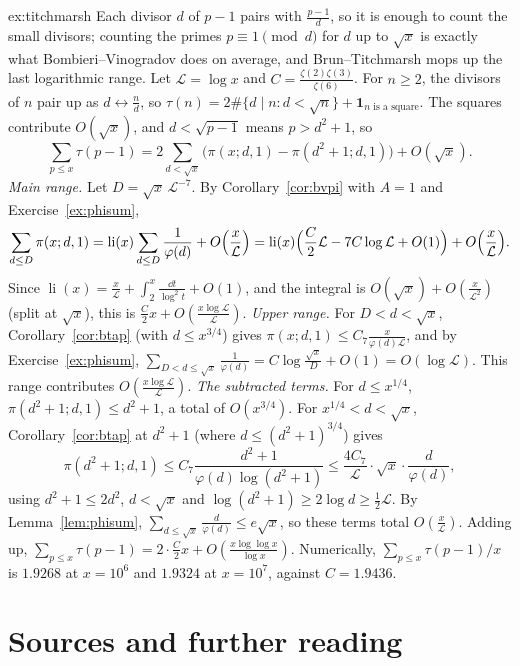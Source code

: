 \begin{solution}{ex:titchmarsh}
\idea Each divisor $d$ of $p-1$ pairs with $\frac{p-1}d$, so it is enough to count the small divisors; counting the primes $p\equiv1\pmod d$ for $d$ up to $\sqrt x$ is exactly what Bombieri--Vinogradov does on average, and Brun--Titchmarsh mops up the last logarithmic range.
\writeup Let $\mathcal L=\log x$ and $C=\frac{\zeta(2)\zeta(3)}{\zeta(6)}$. For $n\ge2$, the divisors of $n$ pair up as $d\leftrightarrow\frac nd$, so $\tau(n)=2\#\{d\mid n:d<\sqrt n\}+\mathbf 1_{n\text{ is a square}}$. The squares contribute $O(\sqrt x)$, and $d<\sqrt{p-1}$ means $p>d^2+1$, so
\[
\sum_{p\le x}\tau(p-1)=2\sum_{d<\sqrt x}\bigl(\pi(x;d,1)-\pi(d^2+1;d,1)\bigr)+O(\sqrt x).
\]
\emph{Main range.} Let $D=\sqrt x\,\mathcal L^{-7}$. By Corollary~\ref{cor:bvpi} with $A=1$ and Exercise~\ref{ex:phisum},
\[
\sum_{d\le D}\pi(x;d,1)=\operatorname{li}(x)\sum_{d\le D}\frac1{\varphi(d)}+O\Bigl(\frac x{\mathcal L}\Bigr)=\operatorname{li}(x)\Bigl(\frac C2\mathcal L-7C\log\mathcal L+O(1)\Bigr)+O\Bigl(\frac x{\mathcal L}\Bigr).
\]
Since $\operatorname{li}(x)=\frac x{\mathcal L}+\int_2^x\frac{\dd t}{\log^2t}+O(1)$, and the integral is $O(\sqrt x)+O(\frac x{\mathcal L^2})$ (split at $\sqrt x$), this is $\frac C2x+O(\frac{x\log\mathcal L}{\mathcal L})$.
\emph{Upper range.} For $D<d<\sqrt x$, Corollary~\ref{cor:btap} (with $d\le x^{3/4}$) gives $\pi(x;d,1)\le C_7\frac x{\varphi(d)\mathcal L}$, and by Exercise~\ref{ex:phisum}, $\sum_{D<d\le\sqrt x}\frac1{\varphi(d)}=C\log\frac{\sqrt x}D+O(1)=O(\log\mathcal L)$. This range contributes $O(\frac{x\log\mathcal L}{\mathcal L})$.
\emph{The subtracted terms.} For $d\le x^{1/4}$, $\pi(d^2+1;d,1)\le d^2+1$, a total of $O(x^{3/4})$. For $x^{1/4}<d<\sqrt x$, Corollary~\ref{cor:btap} at $d^2+1$ (where $d\le(d^2+1)^{3/4}$) gives
\[
\pi(d^2+1;d,1)\le C_7\frac{d^2+1}{\varphi(d)\log(d^2+1)}\le\frac{4C_7}{\mathcal L}\cdot\sqrt x\cdot\frac d{\varphi(d)},
\]
using $d^2+1\le2d^2$, $d<\sqrt x$ and $\log(d^2+1)\ge2\log d\ge\frac12\mathcal L$. By Lemma~\ref{lem:phisum}, $\sum_{d\le\sqrt x}\frac d{\varphi(d)}\le e\sqrt x$, so these terms total $O(\frac x{\mathcal L})$.
Adding up, $\sum_{p\le x}\tau(p-1)=2\cdot\frac C2x+O(\frac{x\log\log x}{\log x})$. Numerically, $\sum_{p\le x}\tau(p-1)/x$ is $1.9268$ at $x=10^6$ and $1.9324$ at $x=10^7$, against $C=1.9436$.
\end{solution}

\section*{Sources and further reading}

